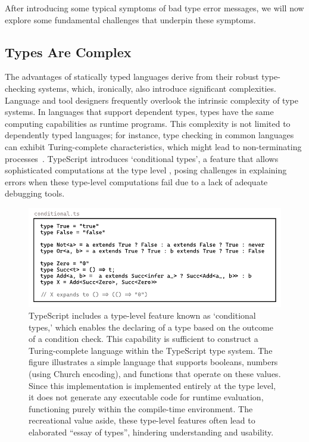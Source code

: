 After introducing some typical symptoms of bad type error messages, we will now explore some fundamental challenges that underpin these symptoms.

\subsection{Types Are Complex}

The advantages of statically typed languages derive from their robust type-checking systems, which, ironically, also introduce significant complexities. Language and tool designers frequently overlook the intrinsic complexity of type systems. In languages that support dependent types, types have the same computing capabilities as runtime programs. This complexity is not limited to dependently typed languages; for instance, type checking in common languages can exhibit Turing-complete characteristics, which might lead to non-terminating processes~\cite{Wells1999-ob}. TypeScript introduces `conditional types', a feature that allows sophisticated computations at the type level \cite{fig:ts-conditional}, posing challenges in explaining errors when these type-level computations fail due to a lack of adequate debugging tools.



\begin{figure}[hbt]
  \includegraphics[width=\linewidth]{Conditional}
  \caption{
    \label{fig:ts-conditional}
    TypeScript includes a type-level feature known as `conditional types,' which enables the declaring of a type based on the outcome of a condition check. This capability is sufficient to construct a Turing-complete language within the TypeScript type system. The figure illustrates a simple language that supports booleans, numbers (using Church encoding), and functions that operate on these values. Since this implementation is implemented entirely at the type level, it does not generate any executable code for runtime evaluation, functioning purely within the compile-time environment. The recreational value aside, these type-level features often lead to elaborated ``essay of types'', hindering understanding and usability.
    }
\end{figure}

